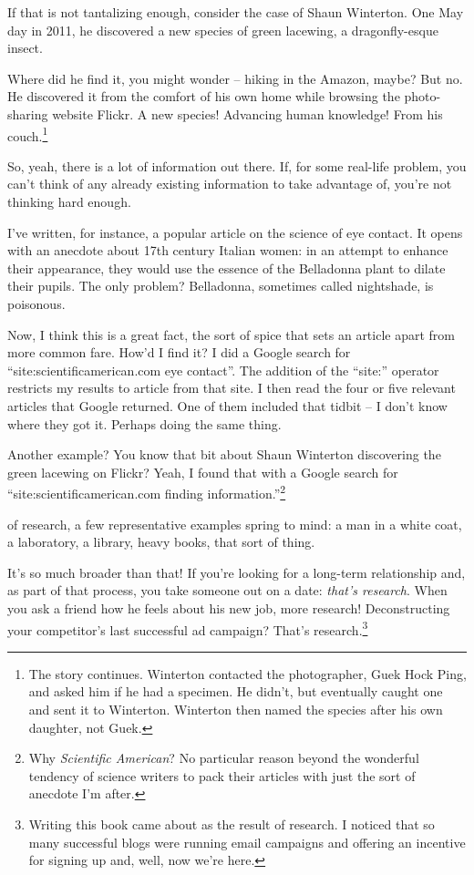 If that is not tantalizing enough, consider the case of Shaun Winterton. One May day in 2011, he discovered a new species of green lacewing, a dragonfly-esque insect.

Where did he find it, you might wonder -- hiking in the Amazon, maybe? But no. He discovered it from the comfort of his own home while browsing the photo-sharing website Flickr. A new species! Advancing human knowledge! From his couch.\cite{winterton2012charismatic}\footnote{The story continues. Winterton contacted the photographer, Guek Hock Ping, and asked him if he had a specimen. He didn't, but eventually caught one and sent it to Winterton. Winterton then named the species after his own daughter, not Guek.} 

So, yeah, there is a lot of information out there. If, for some real-life problem, you can't think of any already existing information to take advantage of, you're not thinking hard enough.

I've written, for instance, a popular article on the science of eye contact. It opens with an anecdote about 17th century Italian women: in an attempt to enhance their appearance, they would use the essence of the Belladonna plant to dilate their pupils. The only problem? Belladonna, sometimes called nightshade, is poisonous.

Now, I think this is a great fact, the sort of spice that sets an article apart from more common fare. How'd I find it? I did a Google search for ``site:scientificamerican.com eye contact''. The addition of the ``site:'' operator restricts my results to article from that site. I then read the four or five relevant articles that Google returned. One of them included that tidbit -- I don't know where they got it. Perhaps doing the same thing.

Another example? You know that bit about Shaun Winterton discovering the green lacewing on Flickr? Yeah, I found that with a Google search for ``site:scientificamerican.com finding information.''\footnote{Why \textit{Scientific American}? No particular reason beyond the wonderful tendency of science writers to pack their articles with just the sort of anecdote I'm after.}

 of research, a few representative examples spring to mind: a man in a white coat, a laboratory, a library, heavy books, that sort of thing.

It's so much broader than that! If you're looking for a long-term relationship and, as part of that process, you take someone out on a date: \textit{that's research}. When you ask a friend how he feels about his new job, more research! Deconstructing your competitor's last successful ad campaign? That's research.\footnote{Writing this book came about as the result of research. I noticed that so many successful blogs were running email campaigns and offering an incentive for signing up and, well, now we're here.}

